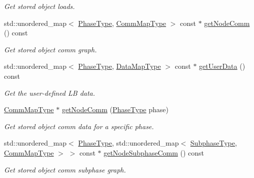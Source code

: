 \begin{DoxyCompactItemize}
\begin{DoxyCompactList}\small\item\em Get stored object loads. \end{DoxyCompactList}\item 
std\+::unordered\+\_\+map$<$ \hyperlink{namespacevt_a46ce6733d5cdbd735d561b7b4029f6d7}{Phase\+Type}, \hyperlink{namespacevt_1_1vrt_1_1collection_1_1balance_a01ee1fb0ae2da1d2ab7fdca3be9ae351}{Comm\+Map\+Type} $>$ const  $\ast$ \hyperlink{structvt_1_1vrt_1_1collection_1_1balance_1_1_node_l_b_data_a01ac3980585c93769570fd4e76ea9218}{get\+Node\+Comm} () const
\begin{DoxyCompactList}\small\item\em Get stored object comm graph. \end{DoxyCompactList}\item 
std\+::unordered\+\_\+map$<$ \hyperlink{namespacevt_a46ce6733d5cdbd735d561b7b4029f6d7}{Phase\+Type}, \hyperlink{namespacevt_1_1vrt_1_1collection_1_1balance_acf152c668ed9e2e9c6b29784181d2435}{Data\+Map\+Type} $>$ const  $\ast$ \hyperlink{structvt_1_1vrt_1_1collection_1_1balance_1_1_node_l_b_data_a73b93e4e239cc32982d5474fca1f7b64}{get\+User\+Data} () const
\begin{DoxyCompactList}\small\item\em Get the user-\/defined LB data. \end{DoxyCompactList}\item 
\hyperlink{namespacevt_1_1vrt_1_1collection_1_1balance_a01ee1fb0ae2da1d2ab7fdca3be9ae351}{Comm\+Map\+Type} $\ast$ \hyperlink{structvt_1_1vrt_1_1collection_1_1balance_1_1_node_l_b_data_a6805869aeb1d424289ddb2b6be653595}{get\+Node\+Comm} (\hyperlink{namespacevt_a46ce6733d5cdbd735d561b7b4029f6d7}{Phase\+Type} phase)
\begin{DoxyCompactList}\small\item\em Get stored object comm data for a specific phase. \end{DoxyCompactList}\item 
std\+::unordered\+\_\+map$<$ \hyperlink{namespacevt_a46ce6733d5cdbd735d561b7b4029f6d7}{Phase\+Type}, std\+::unordered\+\_\+map$<$ \hyperlink{namespacevt_ae78cbfdf1e57470e33eedb074f2beeba}{Subphase\+Type}, \hyperlink{namespacevt_1_1vrt_1_1collection_1_1balance_a01ee1fb0ae2da1d2ab7fdca3be9ae351}{Comm\+Map\+Type} $>$ $>$ const  $\ast$ \hyperlink{structvt_1_1vrt_1_1collection_1_1balance_1_1_node_l_b_data_a783e8620fff1016d7073a3747379127f}{get\+Node\+Subphase\+Comm} () const
\begin{DoxyCompactList}\small\item\em Get stored object comm subphase graph. \end{DoxyCompactList}\item 

\end{DoxyCompactItemize}
